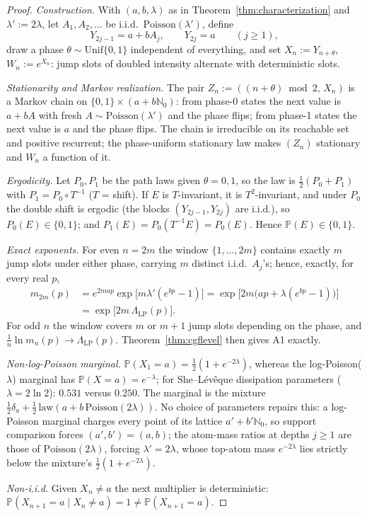 \documentclass[pdflatex,sn-mathphys-num]{sn-jnl}
\theoremstyle{thmstyleone}
\theoremstyle{thmstyletwo}
\theoremstyle{thmstylethree}
\begin{document}
\begin{proof}
\textit{Construction.}  With $(a, b, \lambda)$ as in
Theorem~\ref{thm:characterization} and $\lambda' := 2\lambda$, let
$A_1, A_2, \ldots$ be i.i.d.\ $\mathrm{Poisson}(\lambda')$, define
\[
  Y_{2j-1} = a + bA_j, \qquad Y_{2j} = a \qquad (j \ge 1),
\]
draw a phase $\theta \sim \mathrm{Unif}\{0,1\}$ independent of
everything, and set $X_n := Y_{n+\theta}$, $W_n := e^{X_n}$: jump
slots of doubled intensity alternate with deterministic slots.

\textit{Stationarity and Markov realization.}  The pair $Z_n :=
((n+\theta)\bmod 2,\, X_n)$ is a Markov chain on
$\{0,1\}\times(a+b\mathbb{N}_0)$: from phase-0 states the next value
is $a + bA$ with fresh $A \sim \mathrm{Poisson}(\lambda')$ and the
phase flips; from phase-1 states the next value is $a$ and the phase
flips.  The chain is irreducible on its reachable set and positive
recurrent; the phase-uniform stationary law makes $(Z_n)$
stationary and $W_n$ a function of it.

\textit{Ergodicity.}  Let $P_0, P_1$ be the path laws given $\theta
= 0,1$, so the law is $\tfrac12(P_0+P_1)$ with $P_1 = P_0\circ
T^{-1}$ ($T$ = shift).  If $E$ is $T$-invariant, it is
$T^2$-invariant, and under $P_0$ the double shift is ergodic (the
blocks $(Y_{2j-1}, Y_{2j})$ are i.i.d.), so $P_0(E) \in \{0,1\}$;
and $P_1(E) = P_0(T^{-1}E) = P_0(E)$.  Hence $\mathbb{P}(E) \in
\{0,1\}$.

\textit{Exact exponents.}  For even $n = 2m$ the window
$\{1,\ldots,2m\}$ contains exactly $m$ jump slots under either
phase, carrying $m$ distinct i.i.d.\ $A_j$'s; hence, exactly, for
every real $p$,
\[
\begin{aligned}
  m_{2m}(p)
  &= e^{2map}\exp\bigl[m\lambda'(e^{bp}-1)\bigr]
  = \exp\bigl[2m\bigl(ap + \lambda(e^{bp}-1)\bigr)\bigr]\\
  &= \exp\bigl[2m\,\Lambda_{\mathrm{LP}}(p)\bigr].
\end{aligned}
\]
For odd $n$ the window covers $m$ or $m+1$ jump slots depending on
the phase, and $\tfrac1n\ln m_n(p) \to \Lambda_{\mathrm{LP}}(p)$.
Theorem~\ref{thm:cgflevel} then gives A1 exactly.

\textit{Non-log-Poisson marginal.}  $\mathbb{P}(X_1 = a) =
\tfrac12(1 + e^{-2\lambda})$, whereas the log-Poisson($\lambda$)
marginal has $\mathbb{P}(X = a) = e^{-\lambda}$; for She--L\'ev\^eque
dissipation parameters ($\lambda = 2\ln2$): $0.531$ versus $0.250$.
The marginal is the mixture $\tfrac12\delta_a +
\tfrac12\,\mathrm{law}(a + b\,\mathrm{Poisson}(2\lambda))$.  No
choice of parameters repairs this: a log-Poisson marginal charges
every point of its lattice $a' + b'\mathbb{N}_0$, so support
comparison forces $(a', b') = (a, b)$; the atom-mass ratios at
depths $j \ge 1$ are those of $\mathrm{Poisson}(2\lambda)$, forcing
$\lambda' = 2\lambda$, whose top-atom mass $e^{-2\lambda}$ lies
strictly below the mixture's $\tfrac12(1 + e^{-2\lambda})$.

\textit{Non-i.i.d.}  Given $X_n \ne a$ the next multiplier is
deterministic: $\mathbb{P}(X_{n+1} = a \mid X_n \ne a) = 1 \ne
\mathbb{P}(X_{n+1} = a)$.
\end{proof}
\end{document}

